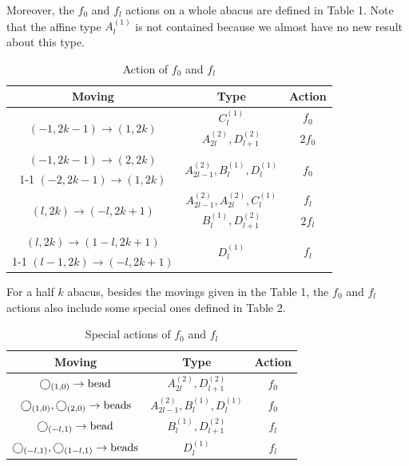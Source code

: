 \documentclass[11pt]{amsart}
\theoremstyle{plain}
\numberwithin{equation}{subsection}
\begin{document}
Moreover, the $f_0$ and $f_l$ actions on a whole abacus are defined in Table 1. 
Note that the affine type $A_l^{(1)}$ is not contained because we almost have no new result about this type.

\begin{table}[H]
\centering
\caption{Action of $f_0$ and $f_l$}
\begin{tabular}{|c|c|c|}
\hline
\textbf{Moving} & \textbf{Type} & \textbf{Action} \\
\hline
\multirow{2}{*}{\((-1, 2k-1)\rightarrow (1, 2k)\)} & \(C_l^{(1)}\) & \(f_0\) \\
\cline{2-3}
& \(A_{2l}^{(2)}, D_{l+1}^{(2)}\) & \(2f_0\) \\
\hline
{\((-1, 2k-1)\rightarrow (2, 2k)\)} & \multirow{2}{*}{\(A_{2l-1}^{(2)}, B_l^{(1)}, D_l^{(1)}\)} & \multirow{2}{*}{\(f_0\)} \\
			\cline{1-1}
			 \((-2, 2k-1)\rightarrow (1, 2k)\) &  & \\
\hline
\multirow{2}{*}{\((l, 2k)\rightarrow (-l, 2k+1)\)} & \(A_{2l-1}^{(2)}, A_{2l}^{(2)}, C_l^{(1)}\) & \(f_l\) \\
\cline{2-3}
& \(B_{l}^{(1)}, D_{l+1}^{(2)}\) & \(2f_l\) \\
\hline
{\((l, 2k)\rightarrow (1-l, 2k+1)\)} & \multirow{2}{*}{\(D_l^{(1)}\)} & \multirow{2}{*}{\(f_l\)} \\
			\cline{1-1}
			 \((l-1, 2k)\rightarrow (-l, 2k+1)\) &  & \\
\hline
		\end{tabular}
\end{table}

For a half $k$ abacus, besides the movings given in the Table 1, the $f_0$ and $f_l$ actions also include 
some special ones defined in Table 2.

\begin{table}[H]
\centering
\caption{Special actions of $f_0$ and $f_l$}
\begin{tabular}{|c|c|c|}
\hline
\textbf{Moving} & \textbf{Type} & \textbf{Action} \\
\hline
\(\bigcirc_{(1, 0)} \rightarrow {\rm bead} \) & \(A_{2l}^{(2)},  D_{l+1}^{(2)}\) & \(f_0\) \\
\hline
 \(\bigcirc_{(1, 0)}, \bigcirc_{(2, 0)}\rightarrow {\rm beads}\) & \(A_{2l-1}^{(2)}, B_{l}^{(1)}, D_l^{(1)}\) & \(f_0\) \\
\hline
\(\bigcirc_{(-l, 1)} \rightarrow {\rm bead} \) & \(B_{l}^{(1)},  D_{l+1}^{(2)}\) & \(f_l\) \\
\hline
 \(\bigcirc_{(-l, 1)}, \bigcirc_{(1-l, 1)}\rightarrow {\rm beads}\) & \(D_l^{(1)}\) & \(f_l\) \\
\hline
\end{tabular}
\end{table}
\end{document}

